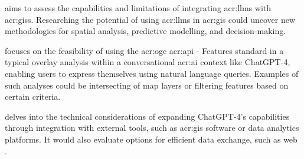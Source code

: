  aims to assess the capabilities and limitations of integrating \glspl{acr:llm} with \glspl{acr:gis}. Researching the potential of using \glspl{acr:llm} in \gls{acr:gis} could uncover new methodologies for spatial analysis, predictive modelling, and decision-making.

 focuses on the feasibility of using the \acrshort{acr:ogc} \acrshort{acr:api} - Features standard in a typical overlay analysis within a conversational \acrshort{acr:ai} context like ChatGPT-4, enabling users to express themselves using natural language queries. Examples of such analyses could be intersecting of map layers or filtering features based on certain criteria.

 delves into the technical considerations of expanding ChatGPT-4's capabilities through integration with external tools, such as \acrshort{acr:gis} software or data analytics platforms. It would also evaluate options for efficient data exchange, such as web .

